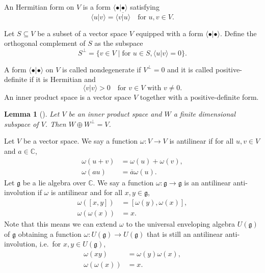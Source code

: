 \documentclass[a4paper, 12pt, reqno]{amsart}
\newtheorem{lemma}[theorem]{Lemma}
\theoremstyle{remark}
\numberwithin{equation}{subsection}
\begin{document}
An Hermitian form on $V$ is a form $\langle \bullet| \bullet\rangle$ satisfying
\begin{equation*}
  \langle u| v\rangle = \overline{\langle v| u\rangle} \quad \text{for }u, v \in V.
\end{equation*}

Let $S \subseteq V$ be a subset of a vector space $V$ equipped with a form $\langle \bullet| \bullet\rangle$.
Define the orthogonal complement of $S$ as the subspace
\begin{equation*}
  S^{\perp} = \{v \in V \mid \text{for }u\in S, \langle u| v\rangle = 0\}.
\end{equation*}

A form $\langle \bullet| \bullet\rangle$ on $V$ is called nondegenerate if $V^{\perp} = 0$ and it is called positive-definite if it is Hermitian and
\begin{equation*}
  \langle v| v\rangle > 0 \quad \text{for }v \in V \text{ with } v \neq 0.
\end{equation*}
An inner product space is a vector space $V$ together with a positive-definite form.

\begin{lemma}[{\cite[\S8.2 Theorem 5]{hoffman_linear_1971}}]
  \label{lmm:13}
  Let $V$ be an inner product space and $W$ a finite dimensional subspace of $V$.
  Then $W \oplus W^{\perp}=V$.
\end{lemma}

Let $V$ be a  vector space.
We say a function $\omega: V \to V$ is antilinear if for all $u, v \in V$ and $a \in \mathbb{C}$,
\begin{align*}
  \omega(u + v) &= \omega(u) + \omega(v), \\
  \omega(au) &= \overline{a}\omega(u).
\end{align*}
Let $\mathfrak{g}$ be a lie algebra over $\mathbb{C}$.
We say a function $\omega: \mathfrak{g} \to \mathfrak{g}$ is an antilinear anti-involution if $\omega$ is antilinear and for all $x, y \in \mathfrak{g}$,
\begin{align*}
  \omega([x, y]) &= [\omega(y), \omega(x)], \\
  \omega(\omega(x)) &= x.
\end{align*}
Note that this means we can extend $\omega$ to the universal enveloping algebra $U(\mathfrak{g})$ of $\mathfrak{g}$ obtaining a function $\omega: U(\mathfrak{g}) \to U(\mathfrak{g})$ that is still an antilinear anti-involution, i.e.\ for $x, y \in U(\mathfrak{g})$,
\begin{align*}
  \omega(xy) &= \omega(y)\omega(x), \\
  \omega(\omega(x)) &= x.
\end{align*}
\end{document}
